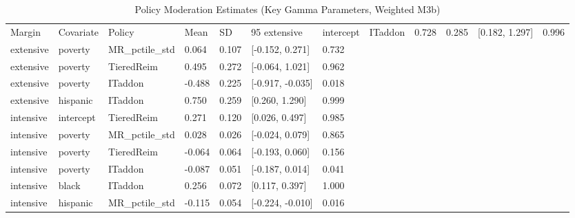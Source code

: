 \begin{table}[htbp]
\centering
\begin{tabular}{lllllll}
  \toprule
Margin & Covariate & Policy & Mean & SD & 95%
  \midrule
extensive & intercept & ITaddon & 0.728 & 0.285 & [0.182, 1.297] & 0.996 \\ 
  extensive & poverty & MR_pctile_std & 0.064 & 0.107 & [-0.152, 0.271] & 0.732 \\ 
  extensive & poverty & TieredReim & 0.495 & 0.272 & [-0.064, 1.021] & 0.962 \\ 
  extensive & poverty & ITaddon & -0.488 & 0.225 & [-0.917, -0.035] & 0.018 \\ 
  extensive & hispanic & ITaddon & 0.750 & 0.259 & [0.260, 1.290] & 0.999 \\ 
  intensive & intercept & TieredReim & 0.271 & 0.120 & [0.026, 0.497] & 0.985 \\ 
  intensive & poverty & MR_pctile_std & 0.028 & 0.026 & [-0.024, 0.079] & 0.865 \\ 
  intensive & poverty & TieredReim & -0.064 & 0.064 & [-0.193, 0.060] & 0.156 \\ 
  intensive & poverty & ITaddon & -0.087 & 0.051 & [-0.187, 0.014] & 0.041 \\ 
  intensive & black & ITaddon & 0.256 & 0.072 & [0.117, 0.397] & 1.000 \\ 
  intensive & hispanic & MR_pctile_std & -0.115 & 0.054 & [-0.224, -0.010] & 0.016 \\ 
   \bottomrule
\end{tabular}
\caption{Policy Moderation Estimates (Key Gamma Parameters, Weighted M3b)} 
\end{table}
